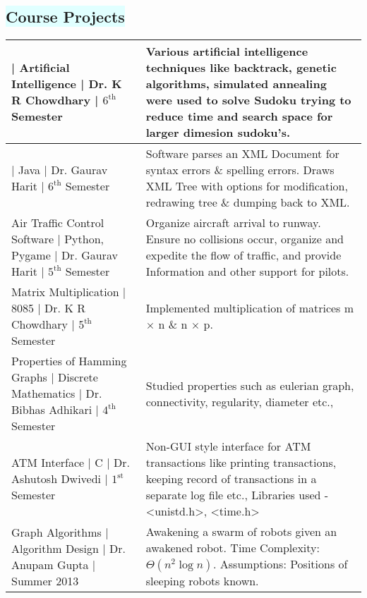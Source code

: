 \documentclass[a4paper,10pt]{extarticle}
\newcommand{\textbfcb}[1] {{\setmainfont{Calibri Bold.ttf}#1}}
\newcommand{\textitci}[1] {{\setmainfont{Calibri Italic.ttf}#1}}
\begin{document}
\begin{mybox}
\subsection*{\colorbox{LightCyan}{\setmainfont{Calibri Bold.ttf}\textbf{Course Projects}}}
\begin{tabular}[H]{|>{\raggedright\arraybackslash}p{5cm}|p{12.5cm}|}
\hline
\textbfcb{Sudoku Solver} | Artificial Intelligence | \textitci{Dr. K R Chowdhary} | \textitci{$6^{\text{th}}$ Semester} &  Various artificial intelligence techniques like backtrack, genetic algorithms, simulated annealing were used to solve Sudoku trying to reduce time and search space for larger dimesion sudoku's.\\ \hline
\textbfcb{XML Parser} | Java | \textitci{Dr. Gaurav Harit} | \textitci{$6^{\text{th}}$ Semester}&  Software parses an XML Document for syntax errors \& spelling errors. Draws XML Tree with options for modification, redrawing tree \& dumping back to XML.\\ \hline
\textbfcb{Air Traffic Control Software} | Python, Pygame | \textitci{Dr. Gaurav Harit} | \textitci{$5^{\text{th}}$ Semester}&  Organize aircraft arrival to runway.
Ensure no collisions occur, organize and expedite the ﬂow of traﬃc, and provide Information and other support for pilots.\\ \hline
\textbfcb{Matrix Multiplication} | 8085 | \textitci{Dr. K R Chowdhary} | \textitci{$5^{\text{th}}$ Semester} & Implemented multiplication of matrices m $\times$ n \& n $\times$ p.\\ \hline
\textbfcb{Properties of Hamming Graphs} | Discrete Mathematics | \textitci{Dr. Bibhas Adhikari} | \textitci{$4^{\text{th}}$ Semester} & Studied properties such as eulerian graph, connectivity, regularity, diameter etc.,\\ \hline
\textbfcb{ATM Interface} | C | \textitci{Dr. Ashutosh Dwivedi} | \textitci{$1^{\text{st}}$ Semester} & Non-GUI style interface for ATM transactions like printing transactions,  keeping record of transactions in a separate log ﬁle etc., Libraries used - <unistd.h>, <time.h>\\ \hline
\textbfcb{Graph Algorithms} | Algorithm Design | \textitci{Dr. Anupam Gupta} | \textitci{Summer 2013} & Awakening a swarm of robots given an awakened robot. Time Complexity: $\Theta (n^2 \log n)$. Assumptions: Positions of sleeping robots known.\\ \hline
\end{tabular}

\end{mybox}
\end{document}
